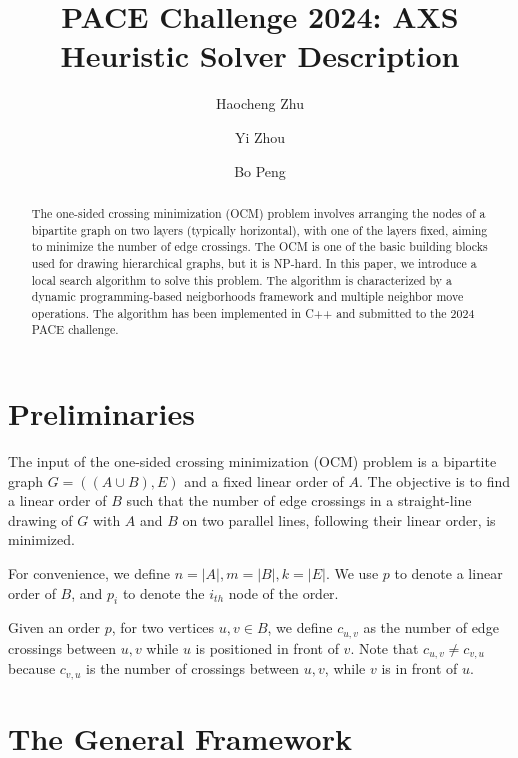 \documentclass[a4paper,ctexart,UKenglish,cleveref, autoref, thm-restate]{lipics-v2021}
\title{PACE Challenge 2024: AXS Heuristic Solver Description } %
\author{Haocheng Zhu}{University of Electronic Science and Technology of China, Chengdu, China}{axs7384@gmail.com}{}{}
\author{Yi Zhou}{University of Electronic Science and Technology of China, Chengdu, China}{zhou.yi@uestc.edu.cn}{https://orcid.org/0000-0002-9023-4374}{}
\author{Bo Peng}{Southwestern University of Finance and Economics, Chengdu, China}{pengbo@swufe.edu.cn}{}{}
\begin{document}
\maketitle

\begin{abstract}
The one-sided crossing minimization (OCM) problem involves arranging the nodes of a bipartite graph on two layers (typically horizontal), with one of the layers fixed, aiming to minimize the number of edge crossings. 
The OCM is one of the basic building blocks used for drawing hierarchical graphs, but it is NP-hard.
In this paper, we introduce a local search algorithm to solve this problem. The algorithm is characterized by a dynamic programming-based neigborhoods framework and multiple neighbor move operations. The algorithm has been implemented in C++ and submitted to the 2024 PACE challenge.
\end{abstract}

\section{Preliminaries}

 The input of the one-sided crossing minimization (OCM) problem is a bipartite graph $G=((A\cup B),E)$ and a fixed linear order of $A$. The objective is to find a linear order of $B$ such that the number of edge crossings in a straight-line drawing of $G$ with $A$ and $B$ on two parallel lines, following their linear order, is minimized.

For convenience, we define $n=|A|,m=|B|,k=|E|$. We use $p$ to denote a linear order of $B$, and $p_i$ to denote the $i_{th}$ node of the order.

Given an order $p$, for two vertices $u,v\in B$, we define $c_{u,v}$ as the number of edge crossings between $u,v$ while $u$ is positioned in front of $v$. 
Note that $c_{u,v}\neq c_{v,u}$ because $c_{v,u}$ is the number of crossings between $u,v$, while $v$ is in front of $u$.

\section{The General Framework}
\end{document}
